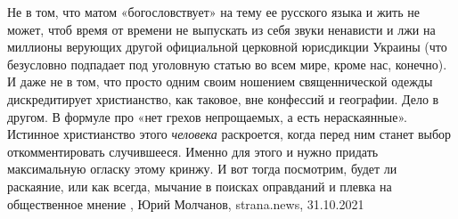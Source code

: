 Не в том, что матом «богословствует» на тему ее русского языка и жить не может,
чтоб время от времени не выпускать из себя звуки ненависти и лжи на миллионы
верующих другой официальной церковной юрисдикции Украины (что безусловно
подпадает под уголовную статью во всем мире, кроме нас, конечно).  И даже не в
том, что просто одним своим ношением священнической одежды дискредитирует
христианство, как таковое, вне конфессий и географии.  Дело в другом. В формуле
про «нет грехов непрощаемых, а есть нераскаянные».  Истинное христианство этого
\emph{человека} раскроется, когда перед ним станет выбор откомментировать
случившееся. Именно для этого и нужно придать максимальную огласку этому
кринжу. И вот тогда посмотрим, будет ли раскаяние, или как всегда, мычание в
поисках оправданий и плевка на общественное мнение
, 
Юрий Молчанов, strana.news, 31.10.2021
